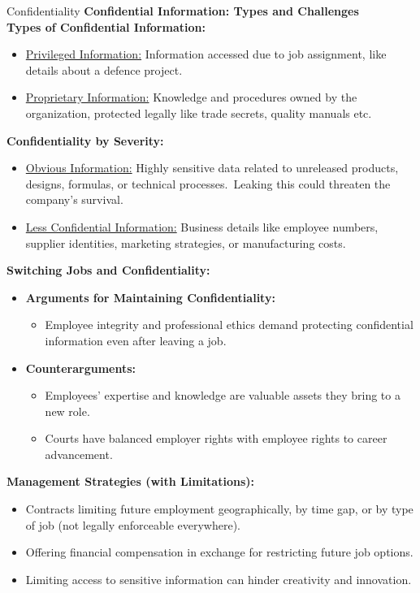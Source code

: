 \documentclass[11pt]{beamer}
\begin{document}
\begin{frame}[t,allowframebreaks]{Confidentiality}
        \textbf{Confidential Information: Types and Challenges}\\[10pt]
        \textbf{Types of Confidential Information:}\\[5pt]
        \begin{itemize}
            \item \ul{Privileged Information:} Information accessed due to job assignment, like details about a
            defence project.
            \item \ul{Proprietary Information:} Knowledge and procedures owned by the organization, protected legally
            like trade secrets, quality manuals etc.
        \end{itemize}
        \textbf{Confidentiality by Severity:}\\[5pt]
        \begin{itemize}
            \item \ul{Obvious Information:} Highly sensitive data related to unreleased products, designs, formulas,
            or technical processes.\ Leaking this could threaten the company's survival.
            \item \ul{Less Confidential Information:} Business details like employee numbers, supplier identities,
            marketing strategies, or manufacturing costs.
        \end{itemize}
        \textbf{Switching Jobs and Confidentiality:}
        \begin{itemize}
            \small
            \item \textbf{Arguments for Maintaining Confidentiality:}
            \begin{itemize}
                \item Employee integrity and professional ethics demand protecting confidential information even
                after leaving a job.
            \end{itemize}
            \item \textbf{Counterarguments:}
            \begin{itemize}
                \item Employees' expertise and knowledge are valuable assets they bring to a new role.
                \item Courts have balanced employer rights with employee rights to career advancement.
            \end{itemize}
        \end{itemize}
        \textbf{Management Strategies (with Limitations):}
        \begin{itemize}
            \small
            \item Contracts limiting future employment geographically, by time gap, or by type of job (not legally
            enforceable everywhere).
            \item Offering financial compensation in exchange for restricting future job options.
            \item Limiting access to sensitive information can hinder creativity and innovation.
        \end{itemize}
    \end{frame}
\end{document}
